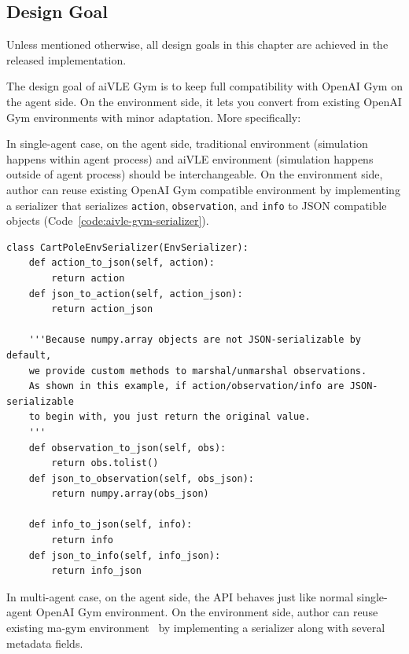 \subsection{Design Goal}
Unless mentioned otherwise, all design goals in this chapter are achieved in the released implementation. 

The design goal of aiVLE Gym is to keep full compatibility with OpenAI Gym on the agent side. On the environment side, it lets you convert from existing OpenAI Gym environments with minor adaptation. More specifically:

In single-agent case, on the agent side, traditional environment (simulation happens within agent process) and aiVLE environment (simulation happens outside of agent process) should be interchangeable. On the environment side, author can reuse existing OpenAI Gym compatible environment by implementing a serializer that serializes \texttt{action}, \texttt{observation}, and \texttt{info} to JSON compatible objects (Code~\ref{code:aivle-gym-serializer}).

\begin{code}
\begin{verbatim}
class CartPoleEnvSerializer(EnvSerializer):
    def action_to_json(self, action):
        return action
    def json_to_action(self, action_json):
        return action_json

    '''Because numpy.array objects are not JSON-serializable by default,
    we provide custom methods to marshal/unmarshal observations.
    As shown in this example, if action/observation/info are JSON-serializable
    to begin with, you just return the original value.
    '''
    def observation_to_json(self, obs):
        return obs.tolist()
    def json_to_observation(self, obs_json):
        return numpy.array(obs_json)

    def info_to_json(self, info):
        return info
    def json_to_info(self, info_json):
        return info_json
\end{verbatim}
\label{code:aivle-gym-serializer}
\end{code}

In multi-agent case, on the agent side, the API behaves just like normal single-agent OpenAI Gym environment. On the environment side, author can reuse existing ma-gym environment~\parencite{magym} by implementing a serializer along with several metadata fields. 

